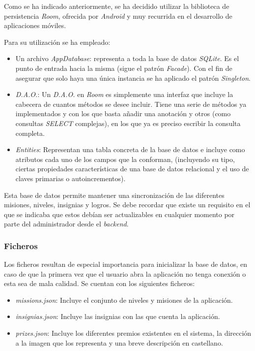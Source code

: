 \documentclass[twoside]{report}
\begin{document}
Como se ha indicado anteriormente, se ha decidido utilizar la biblioteca de persistencia \textit{Room}, ofrecida por \textit{Android} y muy recurrida en el desarrollo de aplicaciones móviles.

Para su utilización se ha empleado:

\begin{itemize}

\item Un archivo \textit{AppDatabase}: representa a toda la base de datos \textit{SQLite}. Es el punto de entrada hacia la misma (sigue el patrón \textit{Facade}). Con el fin de asegurar que solo haya una única instancia se ha aplicado el patrón \textit{Singleton}.

\item \textit{D.A.O.}: Un \textit{D.A.O.} en \textit{Room} es simplemente una interfaz que incluye la cabecera de cuantos métodos se desee incluir. Tiene una serie de métodos ya implementados y con los que basta añadir una anotación y otros (como consultas \textit{SELECT} complejas), en los que ya es preciso escribir la consulta completa.

\item \textit{Entities}: Representan una tabla concreta de la base de datos e incluye como atributos cada uno de los campos que la conforman, (incluyendo su tipo, ciertas propiedades características de una base de datos relacional y el uso de claves primarias o autoincrementos).
\end{itemize}

Esta base de datos permite mantener una sincronización de las diferentes misiones, niveles, insignias y logros. Se debe recordar que existe un requisito en el que se indicaba que estos debían ser actualizables en cualquier momento por parte del administrador desde el \textit{backend}.

\subsubsection{Ficheros}

Los ficheros resultan de especial importancia para inicializar la base de datos, en caso de que la primera vez que el usuario abra la aplicación no tenga conexión o esta sea de mala calidad. Se cuentan con los siguientes ficheros:

\begin{itemize}
\item \textit{missions.json}: Incluye el conjunto de niveles y misiones de la aplicación. 

\item \textit{insignias.json}: Incluye las insignias con las que cuenta la aplicación.

\item \textit{prizes.json}: Incluye los diferentes premios existentes en el sistema, la dirección a la imagen que los representa y una breve descripción en castellano.

\end{itemize}
\end{document}
